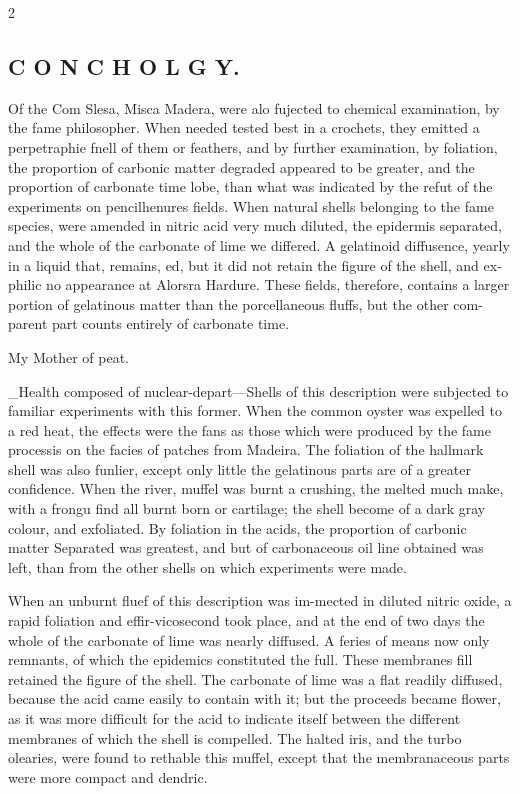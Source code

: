 \documentclass[10pt]{article}
\begin{document}
\begin{multicols}{2}\raggedcolumns
\subsection*{C O N C H O L G Y.}
Of the Com Slesa, Misca Madera, were alo fujected to chemical examination, by the fame philosopher. When needed tested best in a crochets, they emitted a perpetraphie fnell of them or feathers, and by further examination, by foliation, the proportion of carbonic matter degraded appeared to be greater, and the proportion of carbonate time lobe, than what was indicated by the refut of the experiments on pencilhenures fields. When natural shells belonging to the fame species, were amended in nitric acid very much diluted, the epidermis separated, and the whole of the carbonate of lime we differed. A gelatinoid diffusence, yearly in a liquid that, remains, ed, but it did not retain the figure of the shell, and ex-philic no appearance at Alorsra Hardure. These fields, therefore, contains a larger portion of gelatinous matter than the porcellaneous fluffs, but the other com-parent part counts entirely of carbonate time.

My Mother of peat.

\_Health composed of nuclear-depart—Shells of this description were subjected to familiar experiments with this former. When the common oyster was expelled to a red heat, the effects were the fans as those which were produced by the fame processis on the facies of patches from Madeira. The foliation of the hallmark shell was also funlier, except only little the gelatinous parts are of a greater confidence. When the river, muffel was burnt a crushing, the melted much make, with a frongu find all burnt born or cartilage; the shell become of a dark gray colour, and exfoliated. By foliation in the acids, the proportion of carbonic matter Separated was greatest, and but of carbonaceous oil line obtained was left, than from the other shells on which experiments were made.

When an unburnt fluef of this description was im-mected in diluted nitric oxide, a rapid foliation and effir-vicosecond took place, and at the end of two days the whole of the carbonate of lime was nearly diffused. A feries of means now only remnants, of which the epidemics constituted the full. These membranes fill retained the figure of the shell. The carbonate of lime was a flat readily diffused, because the acid came easily to contain with it; but the proceeds became flower, as it was more difficult for the acid to indicate itself between the different membranes of which the shell is compelled. The halted iris, and the turbo olearies, were found to rethable this muffel, except that the membranaceous parts were more compact and dendric.


\end{multicols}
\end{document}
